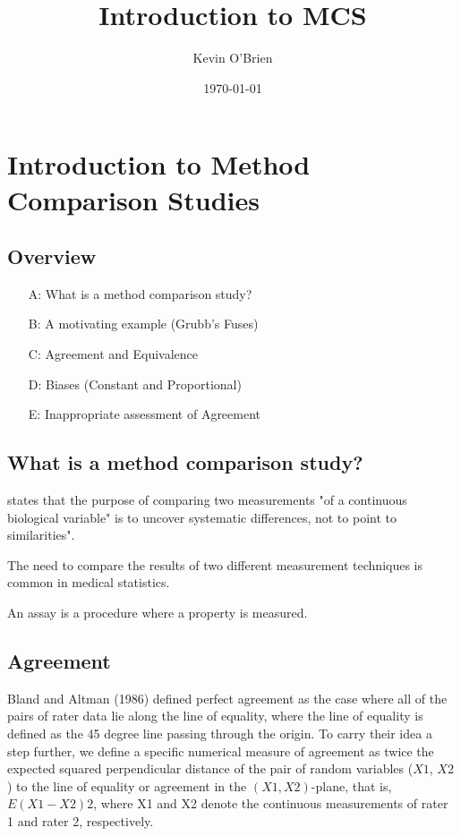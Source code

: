 \documentclass[12pt, a4paper]{report}
\begin{document}
\author{Kevin O'Brien}
\title{Introduction to MCS}
\date{\today}
\maketitle

\tableofcontents \setcounter{tocdepth}{3}

\chapter{Introduction to Method Comparison Studies}
\section*{Overview}

\begin{itemize}
\item[A:] What is a method comparison study?
\item[B:] A motivating example (Grubb's Fuses)
\item[C:] Agreement and Equivalence
\item[D:] Biases (Constant and Proportional)
\item[E:] Inappropriate assessment of Agreement
\end{itemize}


\section{What is a method comparison study?}
\citet{ludbrook97} states that the purpose of comparing two measurements "of a continuous biological variable" is to uncover systematic differences, not to point to similarities".

The need to compare the results of two different measurement techniques is common in medical statistics.

An assay is a procedure where a property is measured.

\newpage
\section{Agreement}
Bland and Altman (1986) defined perfect agreement as the case where all of the pairs of rater data lie along the line of equality, where the line of equality is defined as the 45 degree line passing through the origin. To carry their idea a step further, we define a specific numerical measure of agreement as twice the expected squared perpendicular distance of the pair of random variables ($X1$, $X2$) to the line of equality or agreement in the $(X1,X2)$-plane, that is, $E(X1 - X2)2$, where X1 and X2 denote the continuous measurements of rater 1 and rater 2, respectively.\\
\end{document}
